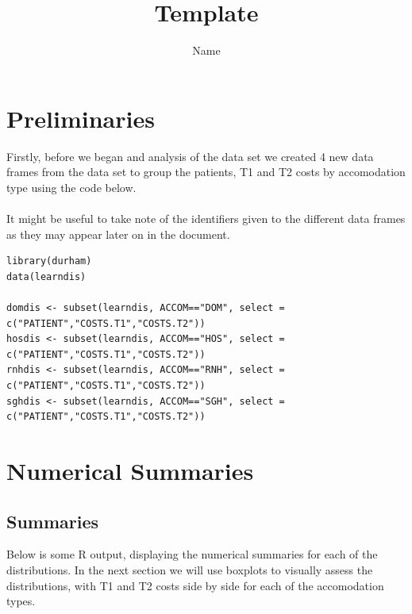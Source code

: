 \documentclass[]{article}
\title{Template}
\author{Name}
\begin{document}
\maketitle
\section{Preliminaries}
Firstly, before we began and analysis of the data set we created 4 new data frames from the data set to group the patients, T1 and T2 costs by accomodation type using the code below.
\\
\\
It might be useful to take note of the identifiers given to the different data frames as they may appear later on in the document.
\begin{lstlisting}
library(durham)
data(learndis)

domdis <- subset(learndis, ACCOM=="DOM", select = c("PATIENT","COSTS.T1","COSTS.T2"))
hosdis <- subset(learndis, ACCOM=="HOS", select = c("PATIENT","COSTS.T1","COSTS.T2"))
rnhdis <- subset(learndis, ACCOM=="RNH", select = c("PATIENT","COSTS.T1","COSTS.T2"))
sghdis <- subset(learndis, ACCOM=="SGH", select = c("PATIENT","COSTS.T1","COSTS.T2"))
\end{lstlisting}
\section{Numerical Summaries}
\subsection{Summaries}
Below is some R output, displaying the numerical summaries for each of the distributions. In the next section we will use boxplots to visually assess the distributions, with T1 and T2 costs side by side for each of the accomodation types.

\end{document}
